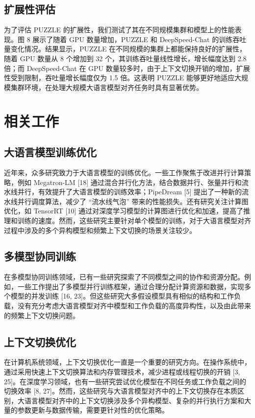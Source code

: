 \subsection{扩展性评估}
为了评估 PUZZLE 的扩展性，我们测试了其在不同规模集群和模型上的性能表现。图 8 展示了随着 GPU 数量增加，PUZZLE 和 DeepSpeed-Chat 的训练吞吐量变化情况。结果显示，PUZZLE 在不同规模的集群上都能保持良好的扩展性，随着 GPU 数量从 8 个增加到 32 个，其训练吞吐量线性增长，增长幅度达到 2.8 倍；而 DeepSpeed-Chat 在 GPU 数量较多时，由于上下文切换开销的增加，扩展性受到限制，吞吐量增长幅度仅为 1.5 倍。这表明 PUZZLE 能够更好地适应大规模集群环境，在处理大规模大语言模型对齐任务时具有显著优势。
\section{相关工作}
\subsection{大语言模型训练优化}
近年来，众多研究致力于大语言模型的训练优化。一些工作聚焦于改进并行计算策略，例如 Megatron-LM [18] 通过混合并行化方法，结合数据并行、张量并行和流水线并行，有效提升了大语言模型的训练效率；PipeDream [5] 提出了一种新的流水线并行调度算法，减少了 “流水线气泡” 带来的性能损失。还有研究关注计算图优化，如 TensorRT [10] 通过对深度学习模型的计算图进行优化和加速，提高了推理和训练的速度。然而，这些研究主要针对单个模型的训练，对于大语言模型对齐过程中涉及的多个异构模型和频繁上下文切换的场景关注较少。
\subsection{多模型协同训练}
在多模型协同训练领域，已有一些研究探索了不同模型之间的协作和资源分配。例如，一些工作提出了多模型并行训练框架，通过合理分配计算资源和数据，实现多个模型的并发训练 [16, 23]。但这些研究大多假设模型具有相似的结构和工作负载，没有充分考虑大语言模型对齐中模型和工作负载的高度异构性，以及由此带来的频繁上下文切换问题。
\subsection{上下文切换优化}
在计算机系统领域，上下文切换优化一直是一个重要的研究方向。在操作系统中，通过采用快速上下文切换算法和内存管理技术，减少进程或线程切换的开销 [3, 25]。在深度学习领域，也有一些研究尝试优化模型在不同任务或工作负载之间的切换效率 [8, 27]。然而，这些研究与大语言模型对齐中的上下文切换存在本质区别，大语言模型对齐中的上下文切换涉及多个异构模型、复杂的并行执行方案和大量的参数更新与数据传输，需要更针对性的优化策略。

